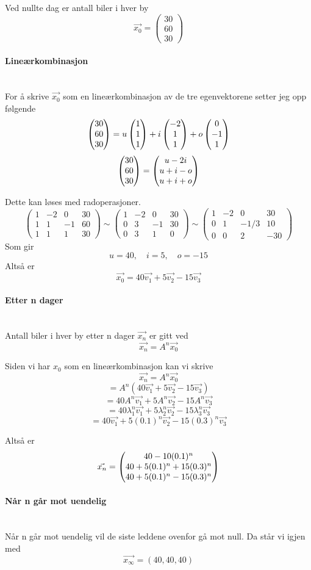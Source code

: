 Ved nullte dag er antall biler i hver by
$$\vec{x_0} = \begin{pmatrix} 30 \\ 60 \\ 30 \end{pmatrix}$$



\paragraph{Lineærkombinasjon} \mbox{} \\
For å skrive $\vec{x_0}$ som en lineærkombinasjon av de tre egenvektorene
setter jeg opp følgende
$$\begin{pmatrix} 30 \\ 60 \\ 30 \end{pmatrix}
  = u\begin{pmatrix} 1 \\ 1 \\ 1 \end{pmatrix} + i\begin{pmatrix} -2 \\ 1 \\ 1 \end{pmatrix} + o\begin{pmatrix} 0 \\ -1 \\ 1 \end{pmatrix}$$
$$\begin{pmatrix} 30 \\ 60 \\ 30 \end{pmatrix} = \begin{pmatrix} u-2i \\ u+i-o \\ u+i+o \end{pmatrix}$$

Dette kan løses med radoperasjoner.
$$\begin{pmatrix}
  1 & -2 &  0 & 30 \\
  1 &  1 & -1 & 60 \\
  1 &  1 &  1 & 30
  \end{pmatrix}
  \sim \begin{pmatrix}
       1 & -2 &  0 & 30 \\
       0 &  3 & -1 & 30 \\
       0 &  3 &  1 & 0
       \end{pmatrix}
  \sim \begin{pmatrix}
       1 & -2 &  0   & 30 \\
       0 &  1 & -1/3 & 10 \\
       0 &  0 &  2   & -30
       \end{pmatrix}$$
Som gir $$u=40, \quad i=5, \quad o=-15$$
Altså er $$\vec{x_0} = 40\vec{v_1} + 5\vec{v_2} - 15\vec{v_3}$$



\paragraph{Etter n dager} \mbox{} \\
Antall biler i hver by etter n dager $\vec{x_n}$ er gitt ved
$$\vec{x_n} = A^n\vec{x_0}$$

Siden vi har $x_0$ som en lineærkombinasjon kan vi skrive
$$\vec{x_n} = A^n\vec{x_0}$$
$$= A^n(40\vec{v_1} + 5\vec{v_2} - 15\vec{v_3})$$
$$= 40A^n\vec{v_1} + 5A^n\vec{v_2} - 15A^n\vec{v_3}$$
$$= 40\lambda_1^n\vec{v_1} + 5\lambda_2^n\vec{v_2} - 15\lambda_3^n\vec{v_3}$$
$$= 40\vec{v_1} + 5(0.1)^n\vec{v_2} - 15(0.3)^n\vec{v_3}$$

Altså er
$$\vec{x_n} =
\begin{pmatrix} 40 - 10(0.1)^n \\ 40 + 5(0.1)^n + 15(0.3)^n \\ 40 + 5(0.1)^n - 15(0.3)^n \end{pmatrix}$$



\paragraph{Når n går mot uendelig} \mbox{} \\
Når n går mot uendelig vil de siste leddene ovenfor gå mot null.
Da står vi igjen med
$$\vec{x_\infty} = (40, 40, 40)$$

